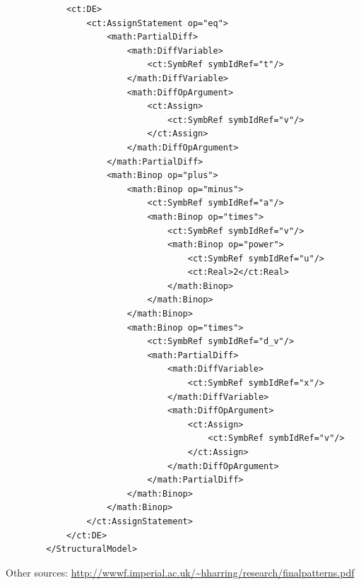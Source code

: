 \begin{lstlisting}
            <ct:DE>
                <ct:AssignStatement op="eq">
                    <math:PartialDiff>
                        <math:DiffVariable>
                            <ct:SymbRef symbIdRef="t"/>
                        </math:DiffVariable>
                        <math:DiffOpArgument>
                            <ct:Assign>
                                <ct:SymbRef symbIdRef="v"/>
                            </ct:Assign>
                        </math:DiffOpArgument>
                    </math:PartialDiff>
                    <math:Binop op="plus">
                        <math:Binop op="minus">
                            <ct:SymbRef symbIdRef="a"/>
                            <math:Binop op="times">
                                <ct:SymbRef symbIdRef="v"/>
                                <math:Binop op="power">
                                    <ct:SymbRef symbIdRef="u"/>
                                    <ct:Real>2</ct:Real>
                                </math:Binop>
                            </math:Binop>
                        </math:Binop>
                        <math:Binop op="times">
                            <ct:SymbRef symbIdRef="d_v"/>
                            <math:PartialDiff>
                                <math:DiffVariable>
                                    <ct:SymbRef symbIdRef="x"/>
                                </math:DiffVariable>
                                <math:DiffOpArgument>
                                    <ct:Assign>
                                        <ct:SymbRef symbIdRef="v"/>
                                    </ct:Assign>
                                </math:DiffOpArgument>
                            </math:PartialDiff>
                        </math:Binop>
                    </math:Binop>
                </ct:AssignStatement>
            </ct:DE>
        </StructuralModel>
\end{lstlisting}


Other sources:
\url{http://wwwf.imperial.ac.uk/~hharring/research/finalpatterns.pdf}


%


